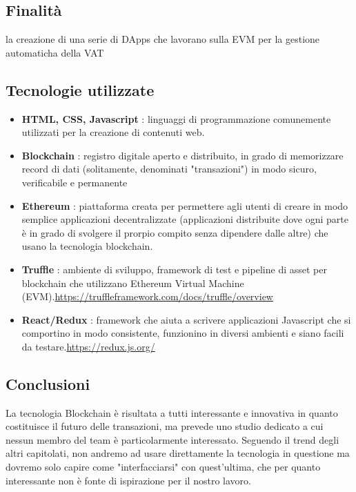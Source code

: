 \documentclass{article}
\begin{document}
        \subsection{Finalità}
            la creazione di una serie di DApps che lavorano sulla EVM per la gestione automaticha della VAT
        \subsection{Tecnologie utilizzate}
            \begin{itemize}
                \item \textbf{HTML, CSS, Javascript} : linguaggi di programmazione comunemente utilizzati per la creazione di contenuti web.
                \item \textbf{Blockchain} : registro digitale aperto e distribuito, in grado di memorizzare record di dati (solitamente, denominati "transazioni") in modo sicuro, verificabile e permanente
                \item \textbf{Ethereum} : piattaforma creata per permettere agli utenti di creare in modo semplice applicazioni decentralizzate (applicazioni distribuite dove ogni parte è in grado di svolgere il prorpio compito senza dipendere dalle altre) che usano la tecnologia blockchain.
                \item \textbf{Truffle} : ambiente di sviluppo, framework di test e pipeline di asset per blockchain che utilizzano Ethereum Virtual Machine (EVM).\newline \url{https://truffleframework.com/docs/truffle/overview}
                \item \textbf{React/Redux} : framework che aiuta a scrivere applicazioni Javascript che si comportino in modo consistente, funzionino in diversi ambienti e siano facili da testare.\newline \url{https://redux.js.org/}
            \end{itemize}
        \subsection{Conclusioni}
            La tecnologia Blockchain è risultata a tutti interessante e innovativa in quanto costituisce il futuro delle transazioni, ma prevede uno studio dedicato a cui nessun membro del team è particolarmente interessato. Seguendo il trend degli altri capitolati, non andremo ad usare direttamente la tecnologia in questione ma dovremo solo capire come "interfacciarsi" con quest'ultima, che per quanto interessante non è fonte di ispirazione per il nostro lavoro.
\newpage			
									
		
\end{document}
